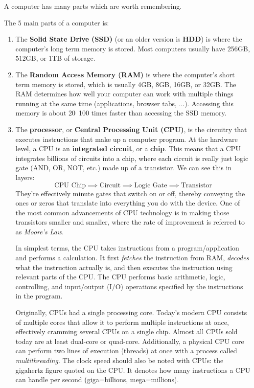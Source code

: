 \documentclass{article}
\begin{document}
  A computer has many parts which are worth remembering. 

  \begin{definition}
  The 5 main parts of a computer is: 
  \begin{enumerate}
      \item The \textbf{Solid State Drive (SSD)} (or an older version is \textbf{HDD}) is where the computer's long term memory is stored. Most computers usually have 256GB, 512GB, or 1TB of storage. 
      
      \item The \textbf{Random Access Memory (RAM)} is where the computer's short term memory is stored, which is usually 4GB, 8GB, 16GB, or 32GB. The RAM determines how well your computer can work with multiple things running at the same time (applications, browser tabs, ...). Accessing this memory is about 20~100 times faster than accessing the SSD memory. 
      
      \item The \textbf{processor}, or \textbf{Central Processing Unit (CPU)}, is the circuitry that executes instructions that make up a computer program. At the hardware level, a CPU is an \textbf{integrated circuit}, or a \textbf{chip}. This means that a CPU integrates billions of circuits into a chip, where each circuit is really just logic gate (AND, OR, NOT, etc.) made up of a transistor. We can see this in layers: 
      \[\text{CPU Chip} \implies \text{Circuit} \implies \text{Logic Gate} \implies \text{Transistor}\]
      They’re effectively minute gates that switch on or off, thereby conveying the ones or zeros that translate into everything you do with the device. One of the most common advancements of CPU technology is in making those transistors smaller and smaller, where the rate of improvement is referred to as \textit{Moore's Law}. 
      
      In simplest terms, the CPU takes instructions from a program/application and performs a calculation. It first \textit{fetches} the instruction from RAM, \textit{decodes} what the instruction actually is, and then executes the instruction using relevant parts of the CPU. The CPU performs basic arithmetic, logic, controlling, and input/output (I/O) operations specified by the instructions in the program. 
      
      Originally, CPUs had a single processing core. Today’s modern CPU consists of multiple cores that allow it to perform multiple instructions at once, effectively cramming several CPUs on a single chip. Almost all CPUs sold today are at least dual-core or quad-core. Additionally, a physical CPU core can perform two lines of execution (threads) at once with a process called \textit{multithreading}. The clock speed should also be noted with CPUs: the gigahertz figure quoted on the CPU. It denotes how many instructions a CPU can handle per second (giga=billions, mega=millions). 
      

\end{enumerate}
\end{definition}
\end{document}
